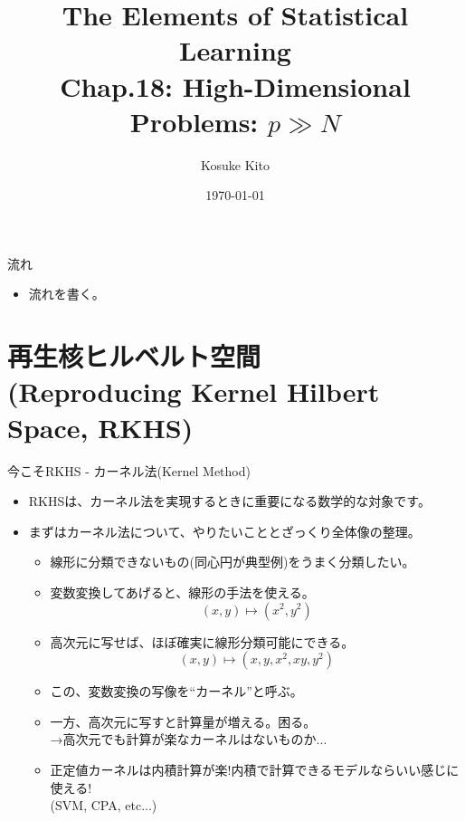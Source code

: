 \documentclass[dvipdfmx,8pt]{beamer}
\title{The Elements of Statistical Learning\\Chap.18: High-Dimensional Problems: $p \gg N$}
\date{\today}
\author{Kosuke Kito}
\begin{document}
  \maketitle
  \begin{frame}{流れ}
    \begin{itemize}
      \item 流れを書く。
    \end{itemize}
  \end{frame}
  \section{再生核ヒルベルト空間\\(Reproducing Kernel Hilbert Space, RKHS)}
  \begin{frame}{今こそRKHS - カーネル法(Kernel Method)}
    \begin{itemize}
      \item RKHSは、カーネル法を実現するときに重要になる数学的な対象です。
      \item まずはカーネル法について、やりたいこととざっくり全体像の整理。\\
        \begin{itemize}
          \item 線形に分類できないもの(同心円が典型例)をうまく分類したい。
          \item 変数変換してあげると、線形の手法を使える。\\
            \[
              (x,y) \mapsto (x^2,y^2)
            \]
          \item 高次元に写せば、ほぼ確実に線形分類可能にできる。
            \[
              (x,y)\mapsto (x,y,x^2,xy,y^2)
            \]
          \item この、変数変換の写像を``カーネル''と呼ぶ。
          \item 一方、高次元に写すと計算量が増える。困る。\\
            →高次元でも計算が楽なカーネルはないものか...
          \item 正定値カーネルは内積計算が楽!内積で計算できるモデルならいい感じに使える!\\
          (SVM, CPA, etc...)
        \end{itemize}
    \end{itemize}
  \end{frame}
\end{document}
